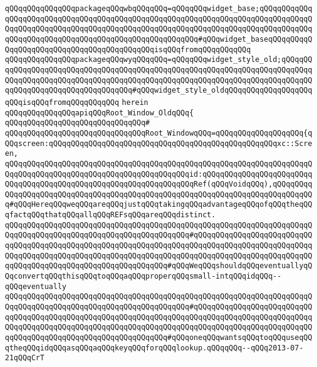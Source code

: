 \verb|qQQqqQQqqQQqqQQqpackageqQQqwbqQQqqQQq=qQQqqQQqwidget_base;qQQqqQQqqQQqqQQqqQQqqQQqqQQqqQQqqQQqqQQqqQQqqQQqqQQqqQQqqQQqqQQqqQQqqQQqqQQqqQQqqQQqqQQqqQQqqQQqqQQqqQQqqQQqqQQqqQQqqQQqqQQqqQQqqQQqqQQqqQQqqQQqqQQqqQQqqQQqqQQqqQQqqQQqqQQqqQQqqQQqqQQqqQQqqQQqqQQq#qQQqwidget_baseqQQqqQQqqQQqqQQqqQQqqQQqqQQqqQQqqQQqqQQqqQQqisqQQqfromqQQqqQQqqQQq|\newline
\verb|qQQqqQQqqQQqqQQqpackageqQQqwyqQQqqQQq=qQQqqQQqwidget_style_old;qQQqqQQqqQQqqQQqqQQqqQQqqQQqqQQqqQQqqQQqqQQqqQQqqQQqqQQqqQQqqQQqqQQqqQQqqQQqqQQqqQQqqQQqqQQqqQQqqQQqqQQqqQQqqQQqqQQqqQQqqQQqqQQqqQQqqQQqqQQqqQQqqQQqqQQqqQQqqQQqqQQqqQQqqQQqqQQq#qQQqwidget_style_oldqQQqqQQqqQQqqQQqqQQqqQQqisqQQqfromqQQqqQQqqQQq|\newline
\verb|herein|\newline
\newline
\verb|qQQqqQQqqQQqqQQqapiqQQqRoot_Window_OldqQQq{|\newline
\verb|qQQqqQQqqQQqqQQqqQQqqQQqqQQqqQQq#|\newline
\verb|qQQqqQQqqQQqqQQqqQQqqQQqqQQqqQQqRoot_WindowqQQq=qQQqqQQqqQQqqQQqqQQq{qQQqscreen:qQQqqQQqqQQqqQQqqQQqqQQqqQQqqQQqqQQqqQQqqQQqqQQqqQQqxc::Screen,|\newline
\verb|qQQqqQQqqQQqqQQqqQQqqQQqqQQqqQQqqQQqqQQqqQQqqQQqqQQqqQQqqQQqqQQqqQQqqQQqqQQqqQQqqQQqqQQqqQQqqQQqqQQqqQQqqQQqqQQqid:qQQqqQQqqQQqqQQqqQQqqQQqqQQqqQQqqQQqqQQqqQQqqQQqqQQqqQQqqQQqqQQqqQQqRef(qQQqVoidqQQq),qQQqqQQqqQQqqQQqqQQqqQQqqQQqqQQqqQQqqQQqqQQqqQQqqQQqqQQqqQQqqQQqqQQqqQQqqQQqqQQq#qQQqHereqQQqweqQQqareqQQqjustqQQqtakingqQQqadvantageqQQqofqQQqtheqQQqfactqQQqthatqQQqallqQQqREFsqQQqareqQQqdistinct.|\newline
\verb|qQQqqQQqqQQqqQQqqQQqqQQqqQQqqQQqqQQqqQQqqQQqqQQqqQQqqQQqqQQqqQQqqQQqqQQqqQQqqQQqqQQqqQQqqQQqqQQqqQQqqQQqqQQqqQQq#qQQqqQQqqQQqqQQqqQQqqQQqqQQqqQQqqQQqqQQqqQQqqQQqqQQqqQQqqQQqqQQqqQQqqQQqqQQqqQQqqQQqqQQqqQQqqQQqqQQqqQQqqQQqqQQqqQQqqQQqqQQqqQQqqQQqqQQqqQQqqQQqqQQqqQQqqQQqqQQqqQQqqQQqqQQqqQQqqQQqqQQqqQQqqQQqqQQqqQQqqQQq#qQQqWeqQQqshouldqQQqeventuallyqQQqconvertqQQqthisqQQqtoqQQqaqQQqproperqQQqsmall-intqQQqidqQQq--qQQqeventually|\newline
\verb|qQQqqQQqqQQqqQQqqQQqqQQqqQQqqQQqqQQqqQQqqQQqqQQqqQQqqQQqqQQqqQQqqQQqqQQqqQQqqQQqqQQqqQQqqQQqqQQqqQQqqQQqqQQqqQQq#qQQqqQQqqQQqqQQqqQQqqQQqqQQqqQQqqQQqqQQqqQQqqQQqqQQqqQQqqQQqqQQqqQQqqQQqqQQqqQQqqQQqqQQqqQQqqQQqqQQqqQQqqQQqqQQqqQQqqQQqqQQqqQQqqQQqqQQqqQQqqQQqqQQqqQQqqQQqqQQqqQQqqQQqqQQqqQQqqQQqqQQqqQQqqQQqqQQqqQQqqQQq#qQQqoneqQQqwantsqQQqtoqQQquseqQQqtheqQQqidqQQqasqQQqaqQQqkeyqQQqforqQQqlookup.qQQqqQQq--qQQq2013-07-21qQQqCrT|\newline
